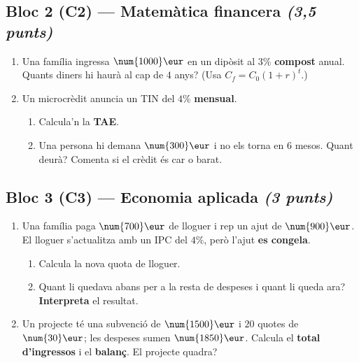 \subsection*{Bloc 2 (C2) — Matemàtica financera \hfill \normalfont\itshape (3,5 punts)}

\begin{enumerate}[label=\textbf{\arabic*.}, leftmargin=2em, itemsep=8pt, start=3]
  \item Una família ingressa $\num{1000}\eur$ en un dipòsit al $3\%$ \textbf{compost}
        anual. Quants diners hi haurà al cap de $4$ anys? (Usa $C_f=C_0(1+r)^t$.)
  \item Un microcrèdit anuncia un TIN del $4\%$ \textbf{mensual}.
    \begin{enumerate}[label=\alph*), leftmargin=1.6em, topsep=2pt]
      \item Calcula'n la \textbf{TAE}.
      \item Una persona hi demana $\num{300}\eur$ i no els torna en $6$ mesos. Quant
            deurà? Comenta si el crèdit és car o barat.
    \end{enumerate}
\end{enumerate}

\subsection*{Bloc 3 (C3) — Economia aplicada \hfill \normalfont\itshape (3 punts)}

\begin{enumerate}[label=\textbf{\arabic*.}, leftmargin=2em, itemsep=8pt, start=5]
  \item Una família paga $\num{700}\eur$ de lloguer i rep un ajut de $\num{900}\eur$. El
        lloguer s'actualitza amb un IPC del $4\%$, però l'ajut \textbf{es congela}.
    \begin{enumerate}[label=\alph*), leftmargin=1.6em, topsep=2pt]
      \item Calcula la nova quota de lloguer.
      \item Quant li quedava abans per a la resta de despeses i quant li queda ara?
            \textbf{Interpreta} el resultat.
    \end{enumerate}
  \item Un projecte té una subvenció de $\num{1500}\eur$ i $20$ quotes de $\num{30}\eur$;
        les despeses sumen $\num{1850}\eur$. Calcula el \textbf{total d'ingressos} i el
        \textbf{balanç}. El projecte quadra?
\end{enumerate}

